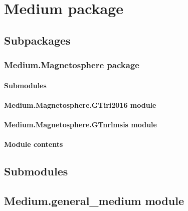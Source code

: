 \documentclass[letterpaper,10pt,english]{sphinxmanual}
\begin{document}
\section{Medium package}
\label{\detokenize{Medium:medium-package}}\label{\detokenize{Medium::doc}}

\subsection{Subpackages}
\label{\detokenize{Medium:subpackages}}
\sphinxstepscope


\subsubsection{Medium.Magnetosphere package}
\label{\detokenize{Medium.Magnetosphere:medium-magnetosphere-package}}\label{\detokenize{Medium.Magnetosphere::doc}}

\paragraph{Submodules}
\label{\detokenize{Medium.Magnetosphere:submodules}}

\paragraph{Medium.Magnetosphere.GTiri2016 module}
\label{\detokenize{Medium.Magnetosphere:medium-magnetosphere-gtiri2016-module}}

\paragraph{Medium.Magnetosphere.GTnrlmsis module}
\label{\detokenize{Medium.Magnetosphere:medium-magnetosphere-gtnrlmsis-module}}

\paragraph{Module contents}
\label{\detokenize{Medium.Magnetosphere:module-contents}}

\subsection{Submodules}
\label{\detokenize{Medium:submodules}}

\subsection{Medium.general\_medium module}
\label{\detokenize{Medium:medium-general-medium-module}}
\end{document}
